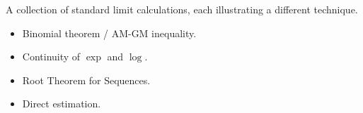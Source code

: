\begin{remark*}
A collection of standard limit calculations, each illustrating a different technique.
\end{remark*}

\begin{remark*}[Dependencies]
\begin{itemize}
  \item Binomial theorem / AM-GM inequality.
  \item Continuity of $\exp$ and $\log$.
  \item Root Theorem for Sequences.
  \item Direct estimation.
\end{itemize}
\end{remark*}
